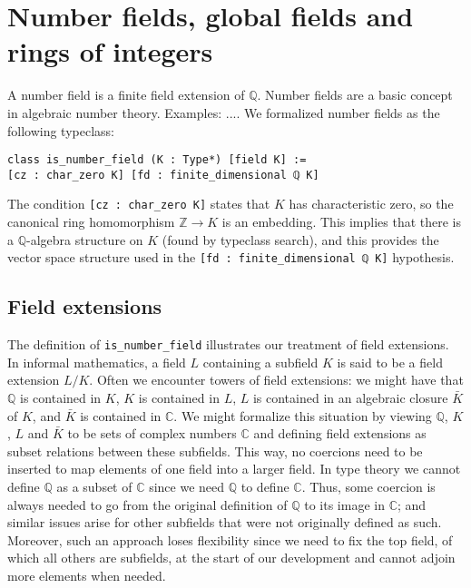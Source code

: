 \documentclass[a4paper,USenglish,cleveref, autoref, thm-restate]{lipics-v2021}
\newcommand{\C}{\mathbb{C}}
\newcommand{\lean}[1]{\texttt{#1}\xspace} %
\newcommand{\Q}{\mathbb{Q}}
\newcommand{\Z}{\mathbb{Z}}
\begin{document}



\section{Number fields, global fields and rings of integers}

A number field is a finite field extension of $\Q$.
Number fields are a basic concept in algebraic number theory. Examples: ....
We formalized number fields as the following typeclass:
\begin{lstlisting}
class is_number_field (K : Type*) [field K] :=
[cz : char_zero K] [fd : finite_dimensional ℚ K]
\end{lstlisting}
The condition \lean{[cz : char\_zero K]} states that $K$ has characteristic zero, so the canonical ring homomorphism $\Z \to K$ is an embedding.
This implies that there is a $\Q$-algebra structure on $K$ (found by typeclass search), and this provides the vector space structure used in the \lean{[fd : finite\_dimensional ℚ K]} hypothesis.

\subsection{Field extensions}

The definition of \lean{is\_number\_field} illustrates our treatment of field extensions.
In informal mathematics, a field $L$ containing a subfield $K$ is said to be a field extension $L / K$.
Often we encounter towers of field extensions: we might have that $\Q$ is contained in $K$, $K$ is contained in $L$, $L$ is contained in an algebraic closure $\bar{K}$ of $K$, and $\bar{K}$ is contained in $\C$.
We might formalize this situation by viewing $\Q$, $K$, $L$ and $\bar{K}$ to be sets of complex numbers $\C$ and defining field extensions as subset relations between these subfields.
This way, no coercions need to be inserted to map elements of one field into a larger field.
In type theory we cannot define $\Q$ as a subset of $\C$ since we need $\Q$ to define $\C$.
Thus, some coercion is always needed to go from the original definition of $\Q$ to its image in $\C$; and similar issues arise for other subfields that were not originally defined as such.
Moreover, such an approach loses flexibility since we need to fix the top field, of which all others are subfields, at the start of our development and cannot adjoin more elements when needed.
\end{document}
